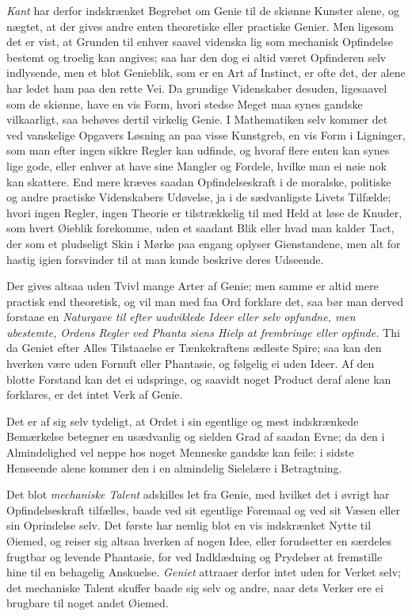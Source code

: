 \documentclass[12pt,a4paper]{article}
\newcommand{\opage}[1]{\marginnote{\footnotesize\textit{[#1]}}}
\begin{document}
\emph{Kant} har derfor indskrænket Begrebet om Genie til de skiønne Kunster alene, og
nægtet, at der gives andre enten theoretiske eller practiske Genier. Men ligesom det er
vist, at Grunden til enhver saavel videnska%
\opage{174}%
lig som mechanisk Opfindelse bestemt og troelig kan angives; saa har den dog ei altid
været Opfinderen selv indlysende, men et blot Genieblik, som er en Art af Instinct, er
ofte det, der alene har ledet ham paa den rette Vei. Da grundige Videnskaber desuden,
ligesaavel som de skiønne, have en vis Form, hvori stedse Meget maa synes gandske
vilkaarligt, saa behøves dertil virkelig Genie. I Mathematiken selv kommer det ved
vanskelige Opgavers Løsning an paa visse Kunstgreb, en vis Form i Ligninger, som man efter
ingen sikkre Regler kan udfinde, og hvoraf flere enten kan synes lige gode, eller enhver
at have sine Mangler og Fordele, hvilke man ei nøie nok kan skattere. End mere kræves
saadan Opfindelseskraft i de moralske, politiske og andre practiske Videnskabers Udøvelse,
ja i de sædvanligste Livets Tilfælde; hvori ingen Regler, ingen Theorie er tilstrækkelig
til med Held at løse de Knuder, som hvert Øieblik forekomme, uden et saadant Blik eller
hvad man kalder Tact, der som et pludseligt Skin i Mørke paa engang oplyser Gienstandene,
men alt for hastig igien forsvinder til at man kunde beskrive deres Udseende.

Der gives altsaa uden Tvivl mange Arter af Genie; men samme er altid mere practisk end
theoretisk, og vil man med faa Ord forklare det, saa bør man derved forstaae en
\emph{Naturgave til efter uudviklede Ideer eller selv opfundne, men ubestemte, Ordens
Regler ved Phanta%
\opage{175}siens Hielp at frembringe eller opfinde.} Thi da Geniet efter Alles Tilstaaelse er
Tænkekraftens ædleste Spire; saa kan den hverken være uden Fornuft eller Phantasie, og
følgelig ei uden Ideer. Af den blotte Forstand kan det ei udspringe, og saavidt noget
Product deraf alene kan forklares, er det intet Verk af Genie.

Det er af sig selv tydeligt, at Ordet i sin egentlige og mest indskrænkede Bemærkelse
betegner en usædvanlig og sielden Grad af saadan Evne; da den i Almindelighed vel neppe
hos noget Menneske gandske kan feile: i sidste Henseende alene kommer den i en almindelig
Sielelære i Betragtning.

Det blot \emph{mechaniske Talent} adskilles let fra Genie, med hvilket det i øvrigt har
Opfindelseskraft tilfælles, baade ved sit egentlige Foremaal og ved sit Væsen eller sin
Oprindelse selv. Det første har nemlig blot en vis indskrænket Nytte til Øiemed, og reiser
sig altsaa hverken af nogen Idee, eller forudsetter en særdeles frugtbar og levende
Phantasie, for ved Indklædning og Prydelser at fremstille hine til en behagelig Anskuelse.
\emph{Geniet} attraaer derfor intet uden for Verket selv; det mechaniske Talent skuffer
baade sig selv og andre, naar dets Verker ere ei brugbare til noget andet Øiemed.
\end{document}
